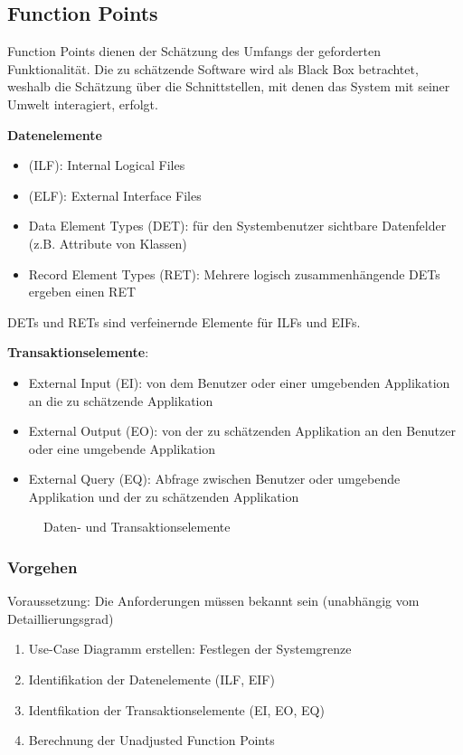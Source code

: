 \subsection{Function Points}
Function Points dienen der Schätzung des Umfangs der geforderten Funktionalität. Die zu schätzende Software wird als Black Box betrachtet, weshalb die Schätzung über die Schnittstellen, mit denen das System mit seiner Umwelt interagiert, erfolgt. 

\textbf{Datenelemente}
\begin{itemize}
	\item (ILF): Internal Logical Files
	\item (ELF): External Interface Files
	\item Data Element Types (DET): für den Systembenutzer sichtbare Datenfelder (z.B. Attribute von Klassen)
	\item Record Element Types (RET): Mehrere logisch zusammenhängende DETs ergeben einen RET
\end{itemize}
DETs und RETs sind verfeinernde Elemente für ILFs und EIFs.

\newpage

\textbf{Transaktionselemente}:
\begin{itemize}
	\item External Input (EI): von dem Benutzer oder einer umgebenden Applikation an die zu schätzende Applikation
	\item External Output (EO): von der zu schätzenden Applikation an den Benutzer oder eine umgebende Applikation
	\item External Query (EQ): Abfrage zwischen Benutzer oder umgebende Applikation und der zu schätzenden Applikation
\end{itemize}

\begin{figure}[hb]
	\centering
	\caption[]{Daten- und Transaktionselemente}
\end{figure}

\subsubsection{Vorgehen}
Voraussetzung: Die Anforderungen müssen bekannt sein (unabhängig vom Detaillierungsgrad)
\begin{enumerate}
	\item Use-Case Diagramm erstellen: Festlegen der Systemgrenze
	\item Identifikation der Datenelemente (ILF, EIF)
	\item Identfikation der Transaktionselemente (EI, EO, EQ) 
	\item Berechnung der Unadjusted Function Points
\end{enumerate}


